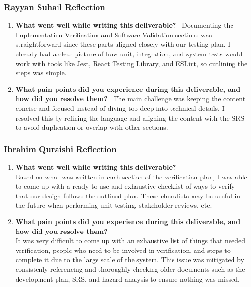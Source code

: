 \documentclass[12pt, titlepage]{article}
\begin{document}
\subsubsection*{Rayyan Suhail Reflection}
\begin{enumerate}
\item \textbf{What went well while writing this deliverable?} \
Documenting the Implementation Verification and Software Validation sections was straightforward since these parts aligned closely with our testing plan. I already had a clear picture of how unit, integration, and system tests would work with tools like Jest, React Testing Library, and ESLint, so outlining the steps was simple.

\item \textbf{What pain points did you experience during this deliverable, and how did you resolve them?} \
The main challenge was keeping the content concise and focused instead of diving too deep into technical details. I resolved this by refining the language and aligning the content with the SRS to avoid duplication or overlap with other sections.
\end{enumerate}

\subsubsection*{Ibrahim Quraishi Reflection}
\begin{enumerate}
  \item \textbf{What went well while writing this deliverable?} \\
  Based on what was written in each section of the verification plan, I was able to come up with a ready to use and exhaustive checklist of ways to verify that our design follows the outlined plan. These checklists may be useful in the future when performing unit testing, stakeholder reviews, etc.
  \item \textbf{What pain points did you experience during this deliverable, and how did you resolve them?} \\
  It was very difficult to come up with an exhaustive list of things that needed verification, people who need to be involved in verification, and steps to complete it due to the large scale of the system. This issue was mitigated by consistenly referencing and thoroughly checking older documents such as the development plan, SRS, and hazard analysis to ensure nothing was missed.
\end{enumerate}
\end{document}
